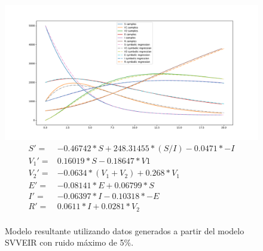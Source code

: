 \begin{figure}[h]
    \centering
    \includegraphics[width=\textwidth]{"figures/final_plot_SVVEIR_0.05.pdf"}
    \begin{align*}
        S' =   & -0.46742 * S + 248.31455 * (S / I) -0.0471 * -I \\
        V_1' = & 0.16019 * S -0.18647 * V1                       \\
        V_2' = & -0.0634 * (V_1 + V_2) + 0.268 * V_1             \\
        E' =   & -0.08141 * E + 0.06799 * S                      \\
        I' =   & -0.06397 * I -0.10318 * -E                      \\
        R' =   & 0.0611 * I + 0.0281 * V_2                       \\
    \end{align*}
    \caption{Modelo resultante utilizando datos generados a partir del modelo SVVEIR con ruido máximo de 5\%.}
    \label{fig:final_plot_SVVEIR_0.05}
\end{figure}

